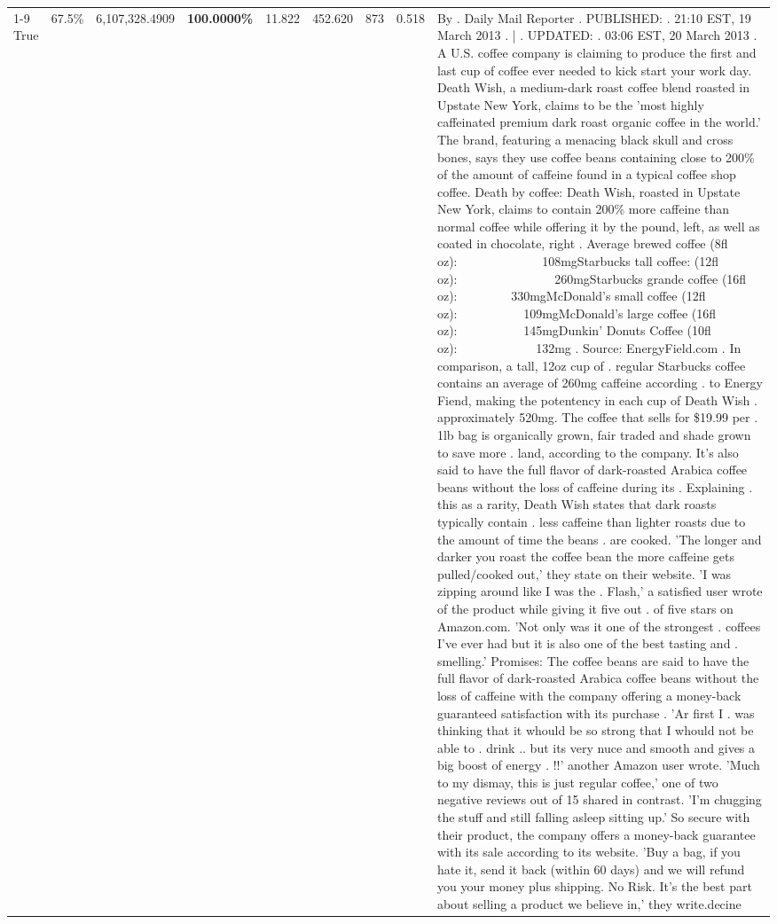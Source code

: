 \begin{table}[H]
{\begin{tabular}{lllrlllll}
\cline{1-9}
True & 67.5\% & 6,107,328.4909 & \bfseries \color{red} 100.0000\% & 11.822 & 452.620 & 873 & 0.518 & By . Daily Mail Reporter . PUBLISHED: . 21:10 EST, 19 March 2013 . | . UPDATED: . 03:06 EST, 20 March 2013 . A U.S. coffee company is claiming to produce the first and last cup of coffee ever needed to kick start your work day. Death Wish, a medium-dark roast coffee blend roasted in Upstate New York, claims to be the 'most highly caffeinated premium dark roast organic coffee in the world.' The brand, featuring a menacing black skull and cross bones, says they use coffee beans containing close to 200\% of the amount of caffeine found in a typical coffee shop coffee. Death by coffee: Death Wish, roasted in Upstate New York, claims to contain 200\% more caffeine than normal coffee while offering it by the pound, left, as well as coated in chocolate, right . Average brewed coffee (8fl oz):              108mgStarbucks tall coffee: (12fl oz):                260mgStarbucks grande coffee (16fl oz):         330mgMcDonald's small coffee (12fl oz):           109mgMcDonald's large coffee (16fl oz):           145mgDunkin' Donuts Coffee (10fl oz):             132mg . Source: EnergyField.com . In comparison, a tall, 12oz cup of . regular Starbucks coffee contains an average of 260mg caffeine according . to Energy Fiend, making the potentency in each cup of Death Wish . approximately 520mg. The coffee that sells for \$19.99 per . 1lb bag is organically grown, fair traded and shade grown to save more . land, according to the company. It's also said to have the full flavor of dark-roasted Arabica coffee beans without the loss of caffeine during its . Explaining . this as a rarity, Death Wish states that dark roasts typically contain . less caffeine than lighter roasts due to the amount of time the beans . are cooked. 'The longer and darker you roast the coffee bean the more caffeine gets pulled/cooked out,' they state on their website. 'I was zipping around like I was the . Flash,' a satisfied user wrote of the product while giving it five out . of five stars on Amazon.com. 'Not only was it one of the strongest . coffees I've ever had but it is also one of the best tasting and . smelling.’ Promises: The coffee beans are said to have the full flavor of dark-roasted Arabica coffee beans without the loss of caffeine with the company offering a money-back guaranteed satisfaction with its purchase . 'Ar first I . was thinking that it whould be so strong that I whould not be able to . drink .. but its very nuce and smooth and gives a big boost of energy . !!' another Amazon user wrote. 'Much to my dismay, this is just regular coffee,' one of two negative reviews out of 15 shared in contrast. 'I'm chugging the stuff and still falling asleep sitting up.' So secure with their product, the company offers a money-back guarantee with its sale according to its website. 'Buy a bag, if you hate it, send it back (within 60 days) and we will refund you your money plus shipping. No Risk. It’s the best part about selling a product we believe in,' they write.decine \\

\end{tabular}}
\end{table}
